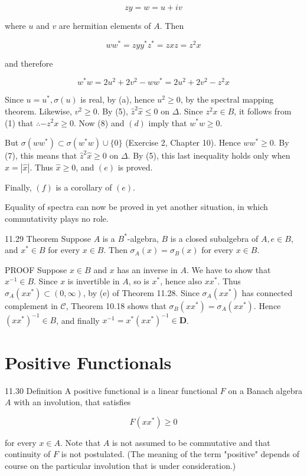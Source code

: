 \documentclass[10pt]{article}
\begin{document}
$$
z y=w=u+i v
$$

where $u$ and $v$ are hermitian elements of $A$. Then

$$
w w^{*}=z y y^{*} z^{*}=z x z=z^{2} x
$$

and therefore

$$
w^{*} w=2 u^{2}+2 v^{2}-w w^{*}=2 u^{2}+2 v^{2}-z^{2} x
$$

Since $u=u^{*}, \sigma(u)$ is real, by (a), hence $u^{2} \geq 0$, by the spectral mapping theorem. Likewise, $v^{2} \geq 0$. By (5), $\hat{z}^{2} \hat{x} \leq 0$ on $\Delta$. Since $z^{2} x \in B$, it follows from (1) that $\therefore-z^{2} x \geq 0$. Now (8) and $(d)$ imply that $w^{*} w \geq 0$.

But $\sigma\left(w w^{*}\right) \subset \sigma\left(w^{*} w\right) \cup\{0\}$ (Exercise 2, Chapter 10). Hence $w w^{*} \geq 0$. By (7), this means that $\hat{z}^{2} \hat{x} \geq 0$ on $\Delta$. By (5), this last inequality holds only when $\hat{x}=|\hat{x}|$. Thus $\hat{x} \geq 0$, and $(e)$ is proved.

Finally, $(f)$ is a corollary of $(e)$.

Equality of spectra can now be proved in yet another situation, in which commutativity plays no role.

11.29 Theorem Suppose $A$ is a $B^{*}$-algebra, $B$ is a closed subalgebra of $A, e \in B$, and $x^{*} \in B$ for every $x \in B$. Then $\sigma_{A}(x)=\sigma_{B}(x)$ for every $x \in B$.

PROOF Suppose $x \in B$ and $x$ has an inverse in $A$. We have to show that $x^{-1} \in B$. Since $x$ is invertible in $A$, so is $x^{*}$, hence also $x x^{*}$. Thus $\sigma_{A}\left(x x^{*}\right) \subset(0, \infty)$, by (e) of Theorem 11.28. Since $\sigma_{A}\left(x x^{*}\right)$ has connected complement in $\mathscr{C}$, Theorem 10.18 shows that $\sigma_{B}\left(x x^{*}\right)=\sigma_{A}\left(x x^{*}\right)$. Hence $\left(x x^{*}\right)^{-1} \in B$, and finally $x^{-1}=x^{*}\left(x x^{*}\right)^{-1} \in \boldsymbol{D}$.

\section{Positive Functionals}
11.30 Definition A positive functional is a linear functional $F$ on a Banach algebra $A$ with an involution, that satisfies

$$
F\left(x x^{*}\right) \geq 0
$$

for every $x \in A$. Note that $A$ is not assumed to be commutative and that continuity of $F$ is not postulated. (The meaning of the term "positive" depends of course on the particular involution that is under consideration.)
\end{document}
